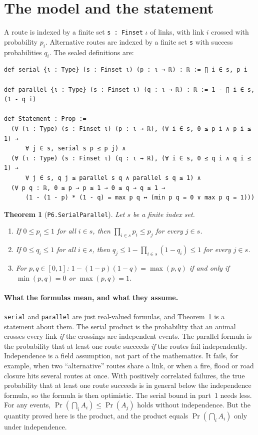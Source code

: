 \documentclass[11pt]{article}
\newtheorem{theorem}{Theorem}
\begin{document}
\section{The model and the statement}
A route is indexed by a finite set \texttt{s : Finset} $\iota$ of links, with link $i$ crossed with probability
$p_i$. Alternative routes are indexed by a finite set \texttt{s} with success probabilities $q_i$. The
sealed definitions are:
\begin{lstlisting}
def serial {ι : Type} (s : Finset ι) (p : ι → ℝ) : ℝ := ∏ i ∈ s, p i

def parallel {ι : Type} (s : Finset ι) (q : ι → ℝ) : ℝ := 1 - ∏ i ∈ s, (1 - q i)

def Statement : Prop :=
  (∀ (ι : Type) (s : Finset ι) (p : ι → ℝ), (∀ i ∈ s, 0 ≤ p i ∧ p i ≤ 1) →
      ∀ j ∈ s, serial s p ≤ p j) ∧
  (∀ (ι : Type) (s : Finset ι) (q : ι → ℝ), (∀ i ∈ s, 0 ≤ q i ∧ q i ≤ 1) →
      ∀ j ∈ s, q j ≤ parallel s q ∧ parallel s q ≤ 1) ∧
  (∀ p q : ℝ, 0 ≤ p → p ≤ 1 → 0 ≤ q → q ≤ 1 →
      (1 - (1 - p) * (1 - q) = max p q ↔ (min p q = 0 ∨ max p q = 1)))
\end{lstlisting}

\begin{theorem}[\texttt{P6.SerialParallel}]\label{thm:sp}
Let $s$ be a finite index set.
\begin{enumerate}
\item If $0\le p_i\le 1$ for all $i\in s$, then $\prod_{i\in s}p_i\le p_j$ for every $j\in s$.
\item If $0\le q_i\le 1$ for all $i\in s$, then $q_j\le 1-\prod_{i\in s}(1-q_i)\le 1$ for every $j\in s$.
\item For $p,q\in[0,1]$: $1-(1-p)(1-q)=\max(p,q)$ if and only if $\min(p,q)=0$ or $\max(p,q)=1$.
\end{enumerate}
\end{theorem}

\paragraph{What the formulas mean, and what they assume.} \texttt{serial} and \texttt{parallel} are just
real-valued formulas, and Theorem~\ref{thm:sp} is a statement about them. The serial product is the
probability that an animal crosses every link \emph{if} the crossings are independent events. The
parallel formula is the probability that at least one route succeeds \emph{if} the routes fail
independently. Independence is a field assumption, not part of the mathematics. It fails, for example,
when two ``alternative'' routes share a link, or when a fire, flood or road closure hits several routes
at once. With positively correlated failures, the true probability that at least one route succeeds is
in general below the independence formula, so the formula is then optimistic. The serial bound in
part~1 needs less. For any events, $\Pr(\bigcap_i A_i)\le\Pr(A_j)$ holds without independence. But the
quantity proved here is the product, and the product equals $\Pr(\bigcap_i A_i)$ only under independence.
\end{document}

